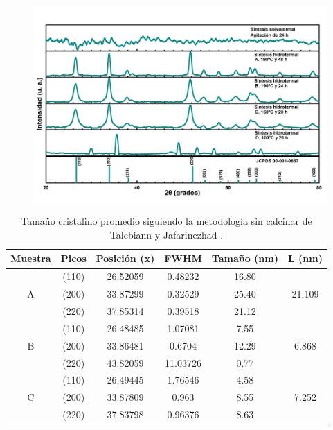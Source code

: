 \documentclass[12pt]{article}
\begin{document}
\begin{figure}[H]
    	   \begin{center}
     	  	\includegraphics[width = 1\textwidth]{Imagenes/SnO2_SinCalcinado_ABCD.png}
    	   \end{center} 
        \end{figure}




\begin{table}[h!]
 \caption{Tamaño cristalino promedio siguiendo la metodología sin calcinar de Talebiann y Jafarinezhad \cite{IEEEreferencias:Ref36}.}
  \centering
  \begin{tabular}{|c|c|c|c|c|c|}
    \hline
    Muestra & Picos & Posición (x) & FWHM & Tamaño (nm) & L (nm)\\
    \hline
    & (110) & 26.52059 & 0.48232 & 16.80 & \\
    A & (200) & 33.87299 & 0.32529 & 25.40 & \textcolor[rgb]{0.16,0.77,0.82}{21.109}\\
    & (220) & 37.85314 & 0.39518 & 21.12 & \\
    \hline
    & (110) & 26.48485 & 1.07081 & 7.55 & \\
    B & (200) & 33.86481 & 0.6704 & 12.29 & \textcolor[rgb]{0.16,0.77,0.82}{6.868}\\
    & (220) & 43.82059 & 11.03726 & 0.77 & \\
    \hline
    & (110) & 26.49445 & 1.76546 & 4.58 & \\
    C & (200) & 33.87809 & 0.963 & 8.55 & \textcolor[rgb]{0.16,0.77,0.82}{7.252}\\
    & (220) & 37.83798 & 0.96376 & 8.63 & \\
    \hline
  \end{tabular}
  \label{tab:drx1}
\end{table}
\end{document}
